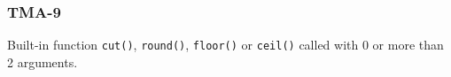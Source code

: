 \subsubsection{TMA-9}\label{sec:error_code_tma_9}

Built-in function \texttt{cut()}, \texttt{round()}, \texttt{floor()} or \texttt{ceil()} called with 0 or more than 2 arguments.


